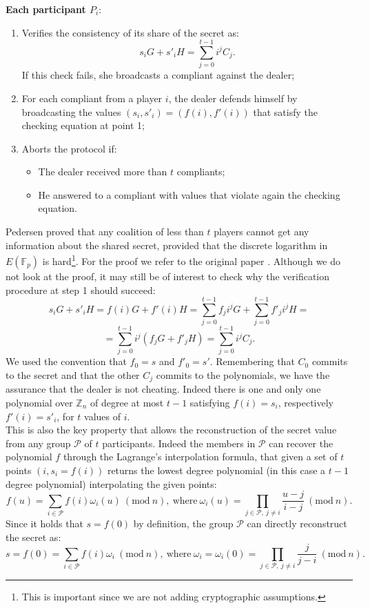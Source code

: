 \bigskip

\noindent
{\bf Each participant $P_i$}:
\begin{enumerate}
	\item Verifies the consistency of its share of the secret as:
	$$s_iG + s'_iH = \sum_{j = 0}^{t - 1}i^jC_j.$$
	If this check fails, she broadcasts a compliant against the dealer;
	\item For each compliant from a player $i$, the dealer defends himself by broadcasting the values $(s_i, s'_i) = (f(i), f'(i))$ that satisfy the checking equation at point 1;
	\item Aborts the protocol if:
	\begin{itemize}
		\item The dealer received more than $t$ compliants;
		\item He answered to a compliant with values that violate again the checking equation.
	\end{itemize}
\end{enumerate}
Pedersen proved that any coalition of less than $t$ players cannot get any information about the shared secret, provided that the discrete logarithm in $E(\mathbb{F}_p)$ is hard\footnote{This is important since we are not adding cryptographic assumptions.}. For the proof we refer to the original paper \cite{RefWork:13}. Although we do not look at the proof, it may still be of interest to check why the verification procedure at step 1 should succeed:
$$s_iG+ s'_iH = f(i)G + f'(i)H = \sum_{j = 0}^{t- 1}f_ji^jG + \sum_{j = 0}^{t - 1}f'_ji^jH =$$
$$= \sum_{j = 0}^{t - 1}i^j(f_jG + f'_jH)= \sum_{j = 0}^{t - 1}i^jC_j.$$
We used the convention that $f_0 = s$ and $f'_0 = s'$. Remembering that $C_0$ commits to the secret and that the other $C_j$ commits to the polynomials, we have the assurance that the dealer is not cheating. Indeed there is one and only one polynomial over $\mathbb{Z}_n$ of degree at most $t - 1$ satisfying $f(i) = s_i$, respectively $f'(i) = s'_i$, for $t$ values of $i$. 
\\
This is also the key property that allows the reconstruction of the secret value from any group $\mathcal{P}$ of $t$ participants. Indeed the members in $\mathcal{P}$ can recover the polynomial $f$ through the Lagrange's interpolation formula, that given a set of $t$ points $(i, s_i = f(i))$ returns the lowest degree polynomial (in this case a $t - 1$ degree polynomial) interpolating the given points:
$$f(u) = \sum_{i \in \mathcal{P}}f(i)\omega_i(u) \ (\text{mod} \ n), \ \text{where} \ \omega_i(u) = \prod_{j \in \mathcal{P}, \ j \neq i}\frac{u - j}{i - j} \ (\text{mod} \ n).$$
Since it holds that $s = f(0)$ by definition, the group $\mathcal{P}$ can directly reconstruct the secret as:
$$s = f(0) = \sum_{i \in \mathcal{P}}f(i)\omega_i \ (\text{mod} \ n),  \ \text{where} \ \omega_i = \omega_i(0) = \prod_{j \in \mathcal{P}, \ j \neq i}\frac{j}{j - i} \ (\text{mod} \ n).$$

